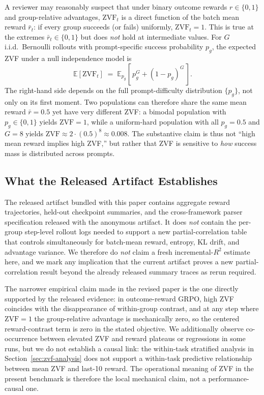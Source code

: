 A reviewer may reasonably suspect that under binary outcome rewards
$r \in \{0,1\}$ and group-relative advantages, $\mathrm{ZVF}_t$ is a direct
function of the batch mean reward $\bar{r}_t$: if every group succeeds
(or fails) uniformly, $\mathrm{ZVF}_t = 1$. This is true at the extremes
$\bar{r}_t \in \{0,1\}$ but does \emph{not} hold at intermediate values.
For $G$ i.i.d.~Bernoulli rollouts with prompt-specific success probability
$p_g$, the expected ZVF under a null independence model is
\begin{equation}
\mathbb{E}[\mathrm{ZVF}_t] \;=\; \mathbb{E}_{p_g}\!\left[\,p_g^{G} + (1-p_g)^{G}\,\right].
\end{equation}
The right-hand side depends on the full prompt-difficulty distribution
$\{p_g\}$, not only on its first moment. Two populations can therefore
share the same mean reward $\bar r = 0.5$ yet have very different ZVF:
a bimodal population with $p_g \in \{0,1\}$ yields $\mathrm{ZVF}=1$,
while a uniform-hard population with all $p_g = 0.5$ and $G=8$ yields
$\mathrm{ZVF} \approx 2 \cdot (0.5)^8 \approx 0.008$. The substantive
claim is thus not ``high mean reward implies high ZVF,'' but rather that
ZVF is sensitive to \emph{how} success mass is distributed across prompts.

\subsection{What the Released Artifact Establishes}

The released artifact bundled with this paper contains aggregate reward
trajectories, held-out checkpoint summaries, and the cross-framework parser
specification released with the anonymous artifact. It does
\emph{not} contain the per-group step-level rollout logs needed to support
a new partial-correlation table that controls simultaneously for
batch-mean reward, entropy, KL drift, and advantage variance. We therefore
do \emph{not} claim a fresh incremental-$R^2$ estimate here, and we mark
any implication that the current artifact proves a new partial-correlation
result beyond the already released summary traces as rerun required.

The narrower empirical claim made in the revised paper is the one directly
supported by the released evidence: in outcome-reward GRPO, high ZVF
coincides with the disappearance of within-group contrast, and at any step
where $\mathrm{ZVF}=1$ the group-relative advantage is mechanically zero, so
the centered reward-contrast term is zero in the stated objective. We additionally observe co-occurrence
between elevated ZVF and reward plateaus or regressions in some runs, but
we do not establish a causal link: the within-task stratified analysis in
Section~\ref{sec:zvf-analysis} does not support a within-task predictive
relationship between mean ZVF and last-10 reward. The operational meaning
of ZVF in the present benchmark is therefore the local mechanical claim,
not a performance-causal one.

